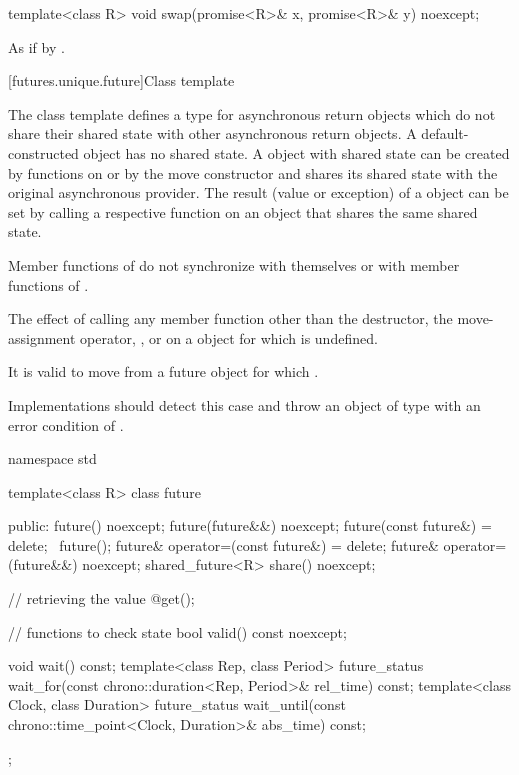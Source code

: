 %
\begin{itemdecl}
template<class R>
  void swap(promise<R>& x, promise<R>& y) noexcept;
\end{itemdecl}

\begin{itemdescr}
\pnum
\effects
As if by .
\end{itemdescr}

[futures.unique.future]{Class template }

\pnum
The class template  defines a type for asynchronous return objects which
do not share their shared state with other asynchronous return objects.
A default-constructed  object has no
shared state. A  object with shared state can be created by
functions on 
or by the move constructor and shares its shared state with
the original asynchronous provider. The result (value or exception) of
a  object
can be
set by
calling a respective function on an
object that shares the same
shared state.

\pnum
\begin{note}
Member functions of  do not synchronize with themselves or with
member functions of .
\end{note}

\pnum
The effect of calling any member function other than the destructor, the
move-assignment operator, , or  on a  object for which
is undefined.
\begin{note}
It is valid to move from a future object for which .
\end{note}
\begin{note}
Implementations should detect this case and throw an object of type
 with an error condition of .
\end{note}

%
\begin{codeblock}
namespace std {
  template<class R>
  class future {
  public:
    future() noexcept;
    future(future&&) noexcept;
    future(const future&) = delete;
    ~future();
    future& operator=(const future&) = delete;
    future& operator=(future&&) noexcept;
    shared_future<R> share() noexcept;

    // retrieving the value
    @\seebelow@ get();

    // functions to check state
    bool valid() const noexcept;

    void wait() const;
    template<class Rep, class Period>
      future_status wait_for(const chrono::duration<Rep, Period>& rel_time) const;
    template<class Clock, class Duration>
      future_status wait_until(const chrono::time_point<Clock, Duration>& abs_time) const;
  };
}
\end{codeblock}

